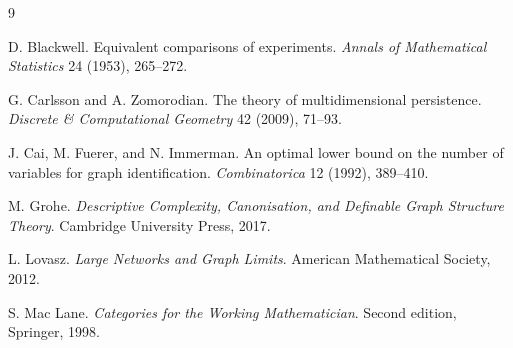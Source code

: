 \documentclass[11pt]{article}
\theoremstyle{definition}
\theoremstyle{remark}
\begin{document}
\begin{thebibliography}{9}

D. Blackwell.
Equivalent comparisons of experiments.
\emph{Annals of Mathematical Statistics} 24 (1953), 265--272.

G. Carlsson and A. Zomorodian.
The theory of multidimensional persistence.
\emph{Discrete \& Computational Geometry} 42 (2009), 71--93.

J. Cai, M. Fuerer, and N. Immerman.
An optimal lower bound on the number of variables for graph identification.
\emph{Combinatorica} 12 (1992), 389--410.

M. Grohe.
\emph{Descriptive Complexity, Canonisation, and Definable Graph Structure Theory}.
Cambridge University Press, 2017.

L. Lovasz.
\emph{Large Networks and Graph Limits}.
American Mathematical Society, 2012.

S. Mac Lane.
\emph{Categories for the Working Mathematician}.
Second edition, Springer, 1998.

\end{thebibliography}
\end{document}
